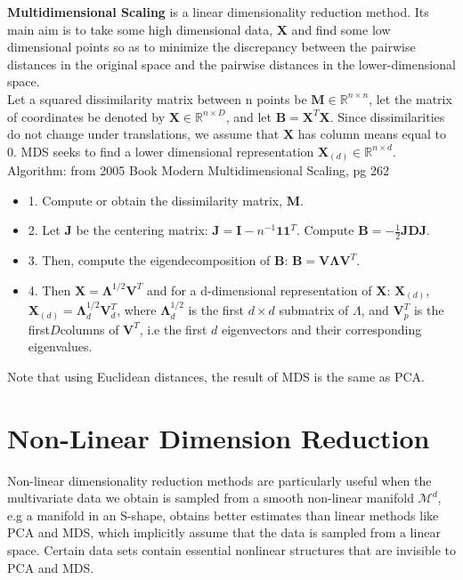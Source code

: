 \documentclass[12pt]{report}
\begin{document}
\textbf{Multidimensional Scaling} is a linear dimensionality reduction method. 
Its main aim is to take some high dimensional data, $\textbf{X}$ 
and find some low dimensional points so as to minimize the discrepancy 
between the pairwise distances in the original space and the pairwise distances 
in the lower-dimensional space. \\
Let a squared dissimilarity matrix between n points be 
$\textbf{M} \in \mathbb{R}^{n \times n}$, 
let the matrix of coordinates be denoted by 
$\textbf{X} \in \mathbb{R}^{n \times D}$, 
and let $\textbf{B} = \textbf{X}^T\textbf{X}$.
Since dissimilarities do not change under translations, 
we assume that $\textbf{X}$ has column means equal to 0. 
MDS seeks to find a lower dimensional representation 
$\textbf{X}_{(d)} \in \mathbb{R}^{n \times d}$.\\
Algorithm: from 2005 Book Modern Multidimensional Scaling, pg 262
\begin{itemize}
    \item 1. Compute or obtain the dissimilarity matrix, \textbf{M}.
    \item 2. Let \textbf{J} be the centering matrix: 
    $\textbf{J} = \textbf{I} - n^{-1}\mathbf{1}\mathbf{1}^T$. 
    Compute $\textbf{B} = -\frac{1}{2}\textbf{J}\textbf{D}\textbf{J}$.
    \item 3. Then, compute the eigendecomposition of \textbf{B}: 
    $\textbf{B} = \textbf{V}\mathbf{\Lambda}\textbf{V}^T$. 
    \item 4. Then $\textbf{X} = \mathbf{\Lambda}^{1/2}\textbf{V}^T$ 
    and for a d-dimensional representation of 
    $\textbf{X}$: $\textbf{X}_{(d)}$, $\textbf{X}_{(d)} = \mathbf{\Lambda}^{1/2}_d\textbf{V}^T_d$, 
    where $\mathbf{\Lambda}^{1/2}_d$ is the first $d \times d$ submatrix of $\Lambda$,
     and $\textbf{V}^T_p$ is the first$D$columns of $\textbf{V}^T$, 
     i.e the first $d$ eigenvectors and their corresponding eigenvalues.
\end{itemize}
Note that using Euclidean distances, the result of MDS is the same as PCA.

\section{Non-Linear Dimension Reduction}

Non-linear dimensionality reduction methods are particularly useful 
when the multivariate data we obtain is sampled from a smooth non-linear manifold $\mathcal{M}^d$, 
e.g a manifold in an S-shape, obtains better estimates than linear methods like PCA and MDS, 
which implicitly assume that the data is sampled from a linear space. 
Certain data sets contain essential nonlinear structures that are invisible to PCA and MDS.
\end{document}
